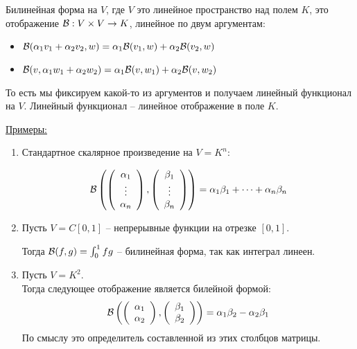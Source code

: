 \begin{conj}
Билинейная форма на $V$, где $V$ это линейное пространство над полем $K$, это отображение $\mathcal{B}: V \times V \to K$, линейное по двум аргументам:
\begin{itemize}
    \item $\mathcal{B}(\alpha_1 v_1 + \alpha_2 v_2, w) = \alpha_1 \mathcal{B}(v_1, w) + \alpha_2\mathcal{B}(v_2, w)$
    \item $\mathcal{B}(v, \alpha_1 w_1 + \alpha_2 w_2) = \alpha_1 \mathcal{B}(v, w_1) + \alpha_2\mathcal{B}(v, w_2)$
\end{itemize}
\end{conj}

\vspace*{5mm}
То есть мы фиксируем какой-то из аргументов и получаем линейный функционал на $V$.
Линейный функционал -- линейное отображение в поле $K$.

\underline{Примеры:}
\begin{enumerate}
    \item Стандартное скалярное произведение на $V = K^n$:

    \[ \mathcal{B} \left(
       \left(\begin{array}{c}
       \alpha_1 \\ 
       \vdots \\ 
       \alpha_n
       \end{array}\right),
       \left(\begin{array}{c}
       \beta_1 \\ 
       \vdots \\
       \beta_n
       \end{array}\right) 
    \right) = \alpha_1 \beta_1 + \dots + \alpha_n \beta_n \]

    \item Пусть $V = C[0, 1]$ -- непрерывные функции на отрезке $[0, 1]$. 
    
    Тогда $\mathcal{B}(f, g) = \int_{0}^{1} fg$ -- билинейная форма, так как интеграл линеен.

    \item Пусть $V = K^2$. \\
    Тогда следующее отображение является билейной формой: \[ \mathcal{B} \left(
        \left(\begin{array}{c}
        \alpha_1 \\ 
        \alpha_2
        \end{array}\right),
        \left(\begin{array}{c}
        \beta_1 \\ 
        \beta_2
        \end{array}\right)
    \right) = \alpha_1 \beta_2 - \alpha_2 \beta_1 \]
    По смыслу это определитель составленной из этих столбцов матрицы.
\end{enumerate}

